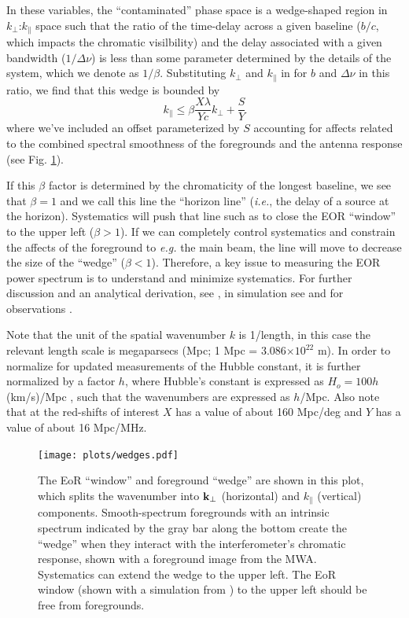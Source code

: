 \documentclass[preprint,11pt]{aastex}
\newcommand{\kvec}{{\bf k}}
\newcommand{\kpr}{{k_\perp}}
\newcommand{\kvpr}{{\kvec_\perp}}
\def\kpar{k_{\|}}
\begin{document}
In these variables, the ``contaminated'' phase space is a wedge-shaped region in $\kpr$:$\kpar$ space such that the ratio of the time-delay across a given baseline ($b/c$,  which impacts the chromatic visilbility) and the delay associated with a given bandwidth ($1/\Delta\nu$) is less than some parameter determined by the details of the system, which we denote as $1/\beta$.  Substituting $\kpr$ and $\kpar$ in for $b$ and $\Delta\nu$ in this ratio, we find that this wedge is bounded by
\begin{equation}
\kpar \le \beta\frac{X\lambda}{Yc}\kpr + \frac{S}{Y}
\end{equation}
where we've included an offset parameterized by $S$ accounting for affects related to the combined spectral smoothness of the foregrounds and the antenna response (see Fig. \ref{fig:wedge}). 

If this $\beta$ factor is determined by the chromaticity of the longest baseline, we see that $\beta=1$ and we call this line the ``horizon line'' ({\em i.e.}, the delay of a source at the horizon).  Systematics will push that line such as to close the EOR ``window'' to the upper left ($\beta > 1$).  If we can completely control systematics and constrain the affects of the foreground to {\em e.g.} the main beam, the line will move to decrease the size of the ``wedge'' ($\beta<1$).
Therefore, a key issue to measuring the EOR power spectrum is to understand and minimize systematics.  For further discussion and an analytical derivation, see \cite{zahn_etal2012,vedantham_2012,liu_et_al2014b},  in simulation see \cite{datta_etal2010,hazelton_et_al2013} and for observations
\cite{pober_etal2013b,2015arXiv150601026P,parsons_etal2014,2015arXiv150206016A}.  

Note that the unit of the spatial wavenumber $k$ is 1/length, in this case the relevant length scale is megaparsecs (Mpc; 1 Mpc = 3.086$\times10^{22}$ m).  In order to normalize for updated measurements of the Hubble constant, it is further normalized by a factor $h$, where Hubble's constant is expressed as $H_o=100h$ (km/s)/Mpc , such that the wavenumbers are expressed as $h$/Mpc.  Also note that at the red-shifts of interest $X$ has a value of about 160 Mpc/deg and $Y$ has a value of about 16 Mpc/MHz.

\begin{figure}[t]
\centerline{
\texttt{[image: plots/wedges.pdf]}
}
\caption{The EoR ``window'' and foreground ``wedge'' are shown in this plot, which splits the wavenumber into $\kvpr$ (horizontal) and $\kpar$ (vertical) components.
Smooth-spectrum foregrounds with an intrinsic spectrum indicated by the gray bar along the bottom create the ``wedge'' when they interact with the interferometer's chromatic response, shown with a foreground image from the MWA.  Systematics can extend the wedge to the upper left.  The EoR window (shown with a simulation
from \citealt{mesinger_et_al2011}) to the upper left should be free from foregrounds.}
\label{fig:wedge}
\end{figure}
\end{document}
